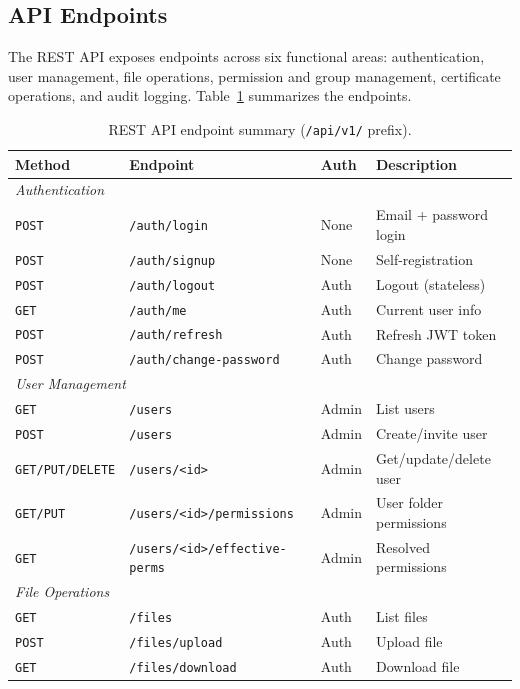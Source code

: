\documentclass[12pt,letterpaper]{report}
\begin{document}
\subsection{API Endpoints}

The REST API exposes endpoints across six functional areas: authentication, user management, file operations, permission and group management, certificate operations, and audit logging. Table~\ref{tab:api-endpoints} summarizes the endpoints.

\begin{table}[ht]
\centering
\caption{REST API endpoint summary (\texttt{/api/v1/} prefix).}
\label{tab:api-endpoints}
\small
\begin{tabular}{llll}
\hline
\textbf{Method} & \textbf{Endpoint} & \textbf{Auth} & \textbf{Description} \\
\hline
\multicolumn{4}{l}{\textit{Authentication}} \\
\texttt{POST} & \texttt{/auth/login} & None & Email + password login \\
\texttt{POST} & \texttt{/auth/signup} & None & Self-registration \\
\texttt{POST} & \texttt{/auth/logout} & Auth & Logout (stateless) \\
\texttt{GET} & \texttt{/auth/me} & Auth & Current user info \\
\texttt{POST} & \texttt{/auth/refresh} & Auth & Refresh JWT token \\
\texttt{POST} & \texttt{/auth/change-password} & Auth & Change password \\
\hline
\multicolumn{4}{l}{\textit{User Management}} \\
\texttt{GET} & \texttt{/users} & Admin & List users \\
\texttt{POST} & \texttt{/users} & Admin & Create/invite user \\
\texttt{GET/PUT/DELETE} & \texttt{/users/<id>} & Admin & Get/update/delete user \\
\texttt{GET/PUT} & \texttt{/users/<id>/permissions} & Admin & User folder permissions \\
\texttt{GET} & \texttt{/users/<id>/effective-perms} & Admin & Resolved permissions \\
\hline
\multicolumn{4}{l}{\textit{File Operations}} \\
\texttt{GET} & \texttt{/files} & Auth & List files \\
\texttt{POST} & \texttt{/files/upload} & Auth & Upload file \\
\texttt{GET} & \texttt{/files/download} & Auth & Download file \\

\end{tabular}
\end{table}
\end{document}
